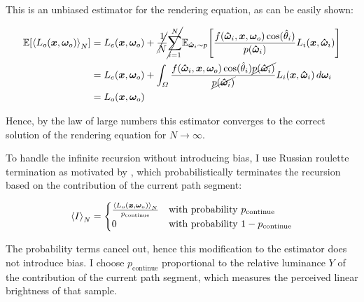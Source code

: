 This is an unbiased estimator for the rendering equation, as can be easily shown:

\begin{equation}
\begin{aligned}
    \expectation{\estimator{L_o(\vec{x}, \vec{\omega}_o)}}
    &= L_e(\vec{x}, \vec{\omega}_o) + \cancel{\frac{1}{N}} \cancel{\sum_{i=1}^{N}} \expectationvar{\vec{\hat{\omega}}_i \sim p}{\frac{f(\vec{\hat{\omega}}_i, \vec{x}, \vec{\omega}_o) \cos(\hat{\theta}_i)}{p(\vec{\hat{\omega}}_i)} L_i(\vec{x}, \vec{\hat{\omega}}_i)} \\
    &= L_e(\vec{x}, \vec{\omega}_o) + \int_{\Omega} \frac{f(\vec{\hat{\omega}}_i, \vec{x}, \vec{\omega}_o) \cos(\hat{\theta}_i) \cancel{p(\vec{\hat{\omega}}_i)}}{\cancel{p(\vec{\hat{\omega}}_i)}} L_i(\vec{x}, \vec{\hat{\omega}}_i) \diff\vec{\omega}_i \\
    &= L_o(\vec{x}, \vec{\omega}_o)
\end{aligned}
\end{equation}

Hence, by the law of large numbers this estimator converges to the correct solution of the rendering equation for $N \to \infty$.

To handle the infinite recursion without introducing bias, I use Russian roulette termination as motivated by \textcite{veach1997}, which probabilistically terminates the recursion based on the contribution of the current path segment:

\begin{equation}
    \estimator{I} =
    \begin{cases}
        \frac{\estimator{L_o(\vec{x}, \vec{\omega}_o)}}{p_\mathrm{continue}} & \text{with probability } p_\mathrm{continue} \\
        0 & \text{with probability } 1 - p_\mathrm{continue}
    \end{cases}
\end{equation}

The probability terms cancel out, hence this modification to the estimator does not introduce bias.
I choose $p_\mathrm{continue}$ proportional to the relative luminance $Y$  of the contribution of the current path segment, which measures the perceived linear brightness of that sample.



